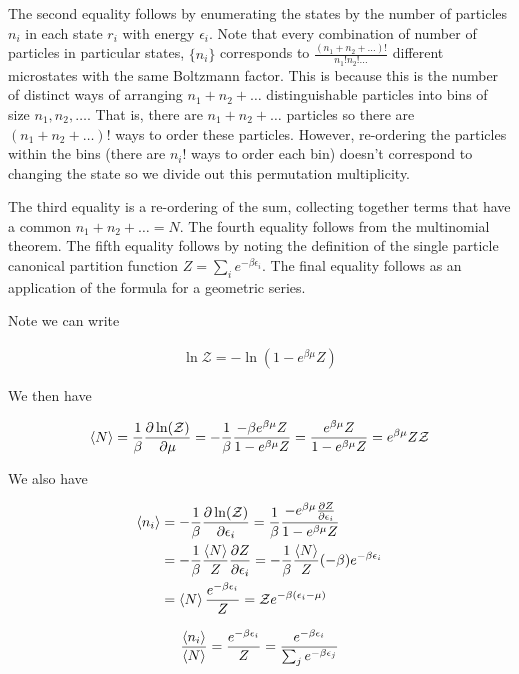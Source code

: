 \documentclass[12pt]{article}
\newcommand{\ep}{\epsilon}
\newcommand{\mc}[1]{\mathcal{#1}}
\begin{document}
The second equality follows by enumerating the states by the number of particles $n_i$ in each state $r_i$ with energy $\ep_i$. Note that every combination of number of particles in particular states, $\{n_i\}$ corresponds to $\frac{(n_1+n_2+\ldots)!}{n_1!n_2!\ldots}$ different microstates with the same Boltzmann factor. This is because this is the number of distinct ways of arranging $n_1+n_2+\ldots$ distinguishable particles into bins of size $n_1,n_2,\ldots$. That is, there are $n_1+n_2+\ldots$ particles so there are $(n_1+n_2+\ldots)!$ ways to order these particles. However, re-ordering the particles within the bins (there are $n_i!$ ways to order each bin) doesn't correspond to changing the state so we divide out this permutation multiplicity.

The third equality is a re-ordering of the sum, collecting together terms that have a common $n_1+n_2+\ldots = N$. The fourth equality follows from the multinomial theorem. The fifth equality follows by noting the definition of the single particle canonical partition function $Z = \sum_i e^{-\beta \ep_i}$. The final equality follows as an application of the formula for a geometric series.

Note we can write

\begin{align}
\ln{\mc{Z}} = -\ln(1-e^{\beta\mu}Z)
\end{align}

We then have

\begin{align}
\Braket{N} = \frac{1}{\beta}\frac{\partial \ln(\mc{Z})}{\partial \mu} = -\frac{1}{\beta}\frac{-\beta e^{\beta\mu}Z}{1-e^{\beta\mu}Z} = \frac{e^{\beta\mu}Z}{1-e^{\beta\mu}Z} = e^{\beta \mu}Z\mc{Z}
\end{align}

We also have

\begin{align}
\Braket{n_i} &= -\frac{1}{\beta}\frac{\partial \ln(\mc{Z})}{\partial \ep_i} = \frac{1}{\beta}\frac{-e^{\beta\mu} \frac{\partial Z}{\partial \ep_i}}{1-e^{\beta \mu}Z}\\
&= -\frac{1}{\beta}\frac{\Braket{N}}{Z} \frac{\partial Z}{\partial \ep_i} = -\frac{1}{\beta}\frac{\Braket{N}}{Z}(-\beta)e^{-\beta \ep_i}\\
&=\Braket{N}\frac{e^{-\beta \ep_i}}{Z} = \mc{Z} e^{-\beta(\ep_i-\mu)}
\end{align}

\begin{align}
\frac{\braket{n_i}}{\braket{N}} = \frac{e^{-\beta \ep_i}}{Z} = \frac{e^{-\beta \ep_i}}{\sum_j e^{-\beta \ep_j}}
\end{align}
\end{document}
